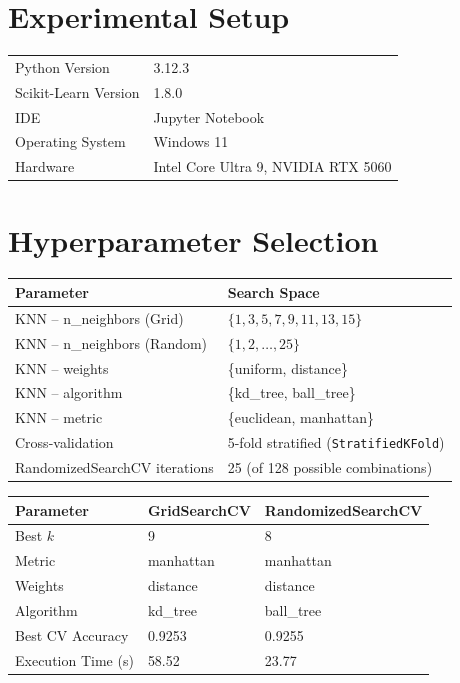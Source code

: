 \documentclass[12pt,a4paper]{article}
\begin{document}
\section{Experimental Setup}
\begin{tabular}{ll}
\toprule
Python Version & 3.12.3 \\
Scikit-Learn Version & 1.8.0 \\
IDE & Jupyter Notebook \\
Operating System & Windows 11 \\
Hardware & Intel Core Ultra 9, NVIDIA RTX 5060 \\
\bottomrule
\end{tabular}

\section{Hyperparameter Selection}

\begin{tabular}{ll}
\toprule
Parameter & Search Space \\
\midrule
KNN -- n\_neighbors (Grid) & $\{1,3,5,7,9,11,13,15\}$ \\
KNN -- n\_neighbors (Random) & $\{1,2,\dots,25\}$ \\
KNN -- weights & \{uniform, distance\} \\
KNN -- algorithm & \{kd\_tree, ball\_tree\} \\
KNN -- metric & \{euclidean, manhattan\} \\
Cross-validation & 5-fold stratified (\texttt{StratifiedKFold}) \\
RandomizedSearchCV iterations & 25 (of 128 possible combinations) \\
\bottomrule
\end{tabular}

\bigskip
\begin{tabular}{lll}
\toprule
Parameter & GridSearchCV & RandomizedSearchCV \\
\midrule
Best $k$ & 9 & 8 \\
Metric & manhattan & manhattan \\
Weights & distance & distance \\
Algorithm & kd\_tree & ball\_tree \\
Best CV Accuracy & 0.9253 & 0.9255 \\
Execution Time (s) & 58.52 & 23.77 \\
\bottomrule
\end{tabular}
\end{document}
